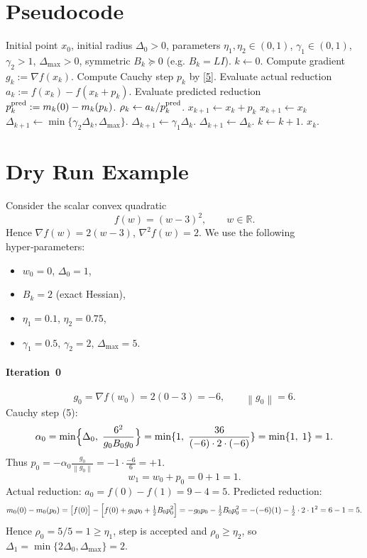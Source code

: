 \documentclass{article}
\newcommand{\norm}[1]{\left\lVert#1\right\rVert}
\newcommand{\R}{\mathbb{R}}
\begin{document}
\section*{Pseudocode}
\begin{algorithm}[H]
\caption{Trust‑Region Gradient Method (TR‑GM)}\label{alg:trgm}
\begin{algorithmic}[1]
\Require Initial point $x_0$, initial radius $\Delta_0>0$, 
        parameters $\eta_1,\eta_2\in(0,1)$,
        $\gamma_1\in(0,1)$, $\gamma_2>1$, $\Delta_{\max}>0$,
        symmetric $B_k\succeq0$ (e.g. $B_k=L I$).
\State $k\gets 0$.
    \State Compute gradient $g_k:=\nabla f(x_k)$.
    \State Compute Cauchy step $p_k$ by \eqref{5}.
    \State Evaluate actual reduction $a_k:=f(x_k)-f(x_k+p_k)$.
    \State Evaluate predicted reduction $p_k^{\rm pred}:=m_k(0)-m_k(p_k)$.
    \State $\rho_k \gets a_k/p_k^{\rm pred}$.
        \State $x_{k+1}\gets x_k+p_k$   
    \Else
        \State $x_{k+1}\gets x_k$      
    \EndIf
        \State $\Delta_{k+1}\gets\min\{\gamma_2\Delta_k,\Delta_{\max}\}$.
        \State $\Delta_{k+1}\gets\gamma_1\Delta_k$.
    \Else
        \State $\Delta_{k+1}\gets\Delta_k$.
    \EndIf
    \State $k\gets k+1$.
\EndWhile
\State \Return $x_k$.
\end{algorithmic}
\end{algorithm}

\section*{Dry Run Example}
Consider the scalar convex quadratic
\[
f(w)=(w-3)^2,\qquad w\in\R .
\]
Hence $\nabla f(w)=2(w-3)$, $\nabla^2 f(w)=2$.  
We use the following hyper‑parameters:

\begin{itemize}
    \item $w_0=0$, $\Delta_0=1$,
    \item $B_k = 2$ (exact Hessian),
    \item $\eta_1=0.1$, $\eta_2=0.75$,
    \item $\gamma_1=0.5$, $\gamma_2=2$, $\Delta_{\max}=5$.
\end{itemize}

\paragraph{Iteration~0}
\[
g_0=\nabla f(w_0)=2(0-3)=-6,\qquad \norm{g_0}=6.
\]
Cauchy step (5):
\[
\alpha_0=\min\Bigl\{\Delta_0,\;\frac{6^2}{g_0 B_0 g_0}\Bigr\}
      =\min\{1,\; \frac{36}{(-6)\cdot2\cdot(-6)}\}
      =\min\{1,\;1\}=1.
\]
Thus $p_0=-\alpha_0\frac{g_0}{\norm{g_0}}=-1\cdot\frac{-6}{6}=+1$.
\[
w_1=w_0+p_0=0+1=1.
\]
Actual reduction: $a_0=f(0)-f(1)=9-4=5$.
Predicted reduction:
\[
m_0(0)-m_0(p_0)=\bigl[f(0)\bigr]-\Bigl[f(0)+g_0 p_0+\tfrac12 B_0 p_0^2\Bigr]
= -g_0p_0-\tfrac12 B_0 p_0^2
= -(-6)(1)-\tfrac12\cdot2\cdot1^2 =6-1=5 .
\]
Hence $\rho_0=5/5=1\ge\eta_1$, step is accepted and $\rho_0\ge\eta_2$, so
$\Delta_1=\min\{2\Delta_0,\Delta_{\max}\}=2$.
\end{document}
